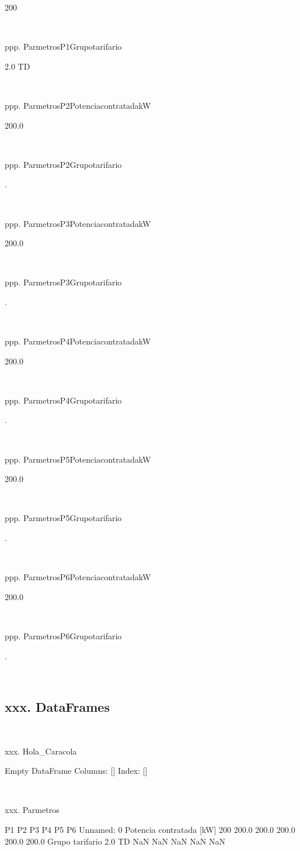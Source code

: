 \documentclass[a4paper,10pt]{article}
\begin{document}
\begin{Form}
200 \

\

ppp. ParmetrosP1Grupotarifario

2.0 TD \

\

ppp. ParmetrosP2PotenciacontratadakW

200.0 \

\

ppp. ParmetrosP2Grupotarifario

. \

\

ppp. ParmetrosP3PotenciacontratadakW

200.0 \

\

ppp. ParmetrosP3Grupotarifario

. \

\

ppp. ParmetrosP4PotenciacontratadakW

200.0 \

\

ppp. ParmetrosP4Grupotarifario

. \

\

ppp. ParmetrosP5PotenciacontratadakW

200.0 \

\

ppp. ParmetrosP5Grupotarifario

. \

\

ppp. ParmetrosP6PotenciacontratadakW

200.0 \

\

ppp. ParmetrosP6Grupotarifario

. \

\
\newpage 
\subsection{xxx. DataFrames}\

xxx. Hola_Caracola

Empty DataFrame
Columns: []
Index: [] \

\

xxx. Parmetros

                              P1     P2     P3     P4     P5     P6
Unnamed: 0                                                         
Potencia contratada [kW]     200  200.0  200.0  200.0  200.0  200.0
Grupo tarifario           2.0 TD    NaN    NaN    NaN    NaN    NaN \


\end{Form}
\end{document}
